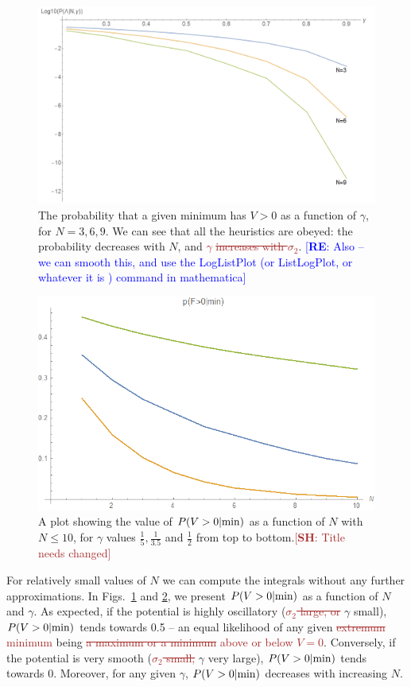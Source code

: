\documentclass[12pt]{article}
\newcommand{\re}[1]{\textcolor{blue}{[{\bf RE}: #1]}}
\newcommand{\SH}[1]{\textcolor{brown}{[{\bf SH}: #1]}}
\newcommand{\sh}[1]{\textcolor{brown}{#1}}
\begin{document}
\begin{figure}
  \centering
  \includegraphics[width=\linewidth]{N369.png}
  \caption{The probability that a given minimum has $V > 0$ as a function of $\gamma$, for $N=3, 6, 9$. We can see that all the heuristics are obeyed: the probability decreases with $N$, and \sh{ $\gamma$ \sout{increases with $\sigma_2$}}. \re{Also -- we can smooth this, and use the LogListPlot (or ListLogPlot, or whatever it is ) command in mathematica}}
  \label{N6}
\end{figure}

\begin{figure}
  \centering
    \includegraphics[width=\linewidth]{PVaryingWithN.png}
  \caption{A plot showing the value of $P(V>0|{\rm min})$ as a function of $N$ with $N\le10$, for $\gamma$ values $\frac{1}{5}, \frac{1}{3.5}$ and $\frac{1}{2}$ from top to bottom.\SH{Title needs changed}}
  \label{gamma}
\end{figure}

For relatively small values of $N$ we can compute the integrals without any further approximations.   In Figs.~\ref{N6} and \ref{gamma}, we present $P(V>0|{\rm min})$ as a function of $N$ and $\gamma$. As expected, if the potential is highly oscillatory (\sh{\sout{$\sigma_2$ large, or}} $\gamma$ small), $P(V>0|{\rm min})$  tends towards 0.5 --  an equal likelihood of any given \sh{\sout{extremum} minimum} being \sh{\sout{a maximum or a minimum} above or below $V=0$}. Conversely, if the potential is very smooth (\sh{\sout{$\sigma_2$ small;}} $\gamma$ very large), $P(V>0|{\rm min})$  tends towards 0. Moreover, for any given $\gamma$, $P(V>0|{\rm min})$ decreases with increasing $N$. 
 
\end{document}
